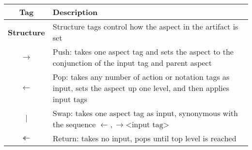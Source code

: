 \begin{table}[h!]
  \centering
  \begin{tabular}{c p{1.8\linewidth}}
    \textbf{Tag} & \textbf{Description} \\
    \hline
    \hline


    \textbf{Structure} &  Structure tags control how the aspect in the artifact is set \\
    \hline
    $\rightarrow$ & Push: takes one aspect tag and sets the aspect to the conjunction of the input tag and parent aspect \\
    $\leftarrow$ & Pop: takes any number of action or notation tags as input, sets the aspect up one level, and then applies input tags\\
    $|$ & Swap: takes one aspect tag as input, synonymous with the sequence $\leftarrow, \rightarrow \text{<input tag>}$ \\
    $\twoheadleftarrow$ & Return: takes no input, pops until top level is reached \\


\end{tabular}
\end{table}
